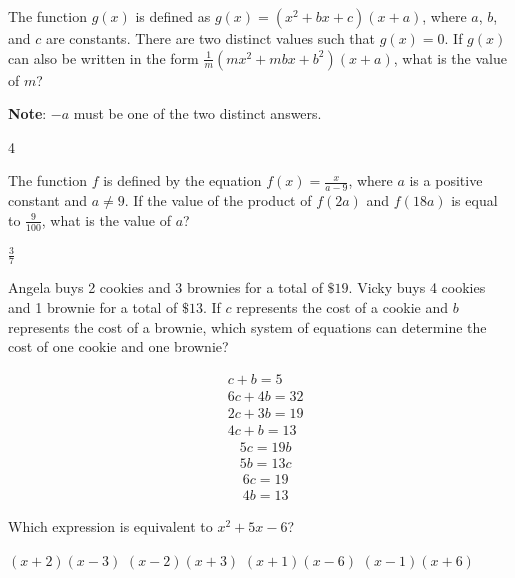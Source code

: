 \question[1]
The function $g(x)$ is defined as $g(x) = (x^2 + bx + c)(x + a)$, where $a$, $b$, and $c$ are constants. There are two distinct values such that $g(x) = 0$. If $g(x)$ can also be written in the form $\frac{1}{m}(mx^2 + mbx + b^2)(x + a)$, what is the value of $m$?

\textbf{Note}: $-a$ must be one of the two distinct answers.
\begin{solution}
4
\end{solution}






\newpage





\question[1]
The function $f$ is defined by the equation $f(x) = \frac{x}{a-9}$, where $a$ is a positive constant and $a \neq 9$. If the value of the product of $f(2a)$ and $f(18a)$ is equal to $\frac{9}{100}$, what is the value of $a$?
\begin{solution}
$\frac{3}{7}$
\end{solution}

\question[1]
Angela buys 2 cookies and 3 brownies for a total of $\$19$. Vicky buys 4 cookies and 1 brownie for a total of $\$13$. If $c$ represents the cost of a cookie and $b$ represents the cost of a brownie, which system of equations can determine the cost of one cookie and one brownie?
\begin{choices}
  \choice
  \[
    \begin{aligned}
    & c+b=5 \\
    & 6c+4b=32
    \end{aligned}
  \]
  \CorrectChoice
  \[
    \begin{aligned}
    & 2c+3b=19 \\
    & 4c+b=13
    \end{aligned}
  \]
  \choice
  \[
    \begin{aligned}
    & 5c=19b \\
    & 5b=13c
    \end{aligned}
  \]
  \choice
  \[
    \begin{aligned}
    & 6c=19 \\
    & 4b=13
    \end{aligned}
  \]
\end{choices}

\question[1]
Which expression is equivalent to $x^2 + 5x - 6$?
\begin{choices}
  \choice $(x+2)(x-3)$
  \choice $(x-2)(x+3)$
  \choice $(x+1)(x-6)$
  \CorrectChoice $(x-1)(x+6)$
\end{choices}






